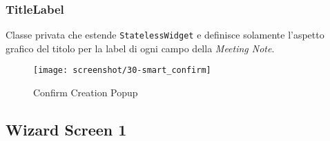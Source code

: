 \subsubsection*{TitleLabel}
\label{subsubsec:title-label}

Classe privata che estende \lstinline{StatelessWidget} e definisce solamente l'aspetto grafico del titolo per la label di ogni campo della \emph{Meeting Note}.

\begin{figure}[!h] 
    \centering 
    \texttt{[image: screenshot/30-smart\_confirm]} 
    \caption{Confirm Creation Popup}
    \label{fig:smart-popup}
\end{figure}

\subsection{Wizard Screen 1}
\label{subsec:wizard-screen-1}



